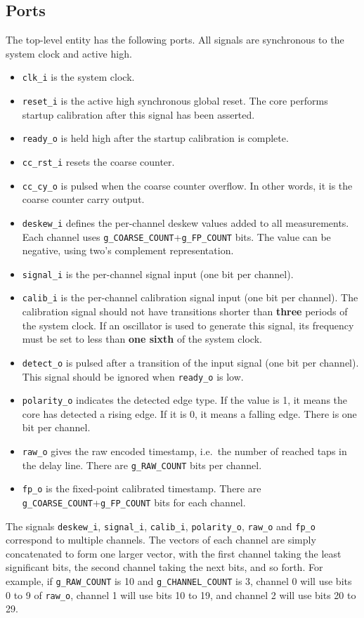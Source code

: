\documentclass[a4paper,11pt]{article}
\begin{document}
\subsection{Ports}
The top-level entity has the following ports. All signals are synchronous to the system clock and active high.
\begin{itemize}
\item \verb!clk_i! is the system clock.
\item \verb!reset_i! is the active high synchronous global reset. The core performs startup calibration after this signal has been asserted.
\item \verb!ready_o! is held high after the startup calibration is complete.
\item \verb!cc_rst_i! resets the coarse counter.
\item \verb!cc_cy_o! is pulsed when the coarse counter overflow. In other words, it is the coarse counter carry output.
\item \verb!deskew_i! defines the per-channel deskew values added to all measurements. Each channel uses \verb!g_COARSE_COUNT!+\verb!g_FP_COUNT! bits. The value can be negative, using two's complement representation.
\item \verb!signal_i! is the per-channel signal input (one bit per channel).
\item \verb!calib_i! is the per-channel calibration signal input (one bit per channel). The calibration signal should not have transitions shorter than \textbf{three} periods of the system clock. If an oscillator is used to generate this signal, its frequency must be set to less than \textbf{one sixth} of the system clock.
\item \verb!detect_o! is pulsed after a transition of the input signal (one bit per channel). This signal should be ignored when \verb!ready_o! is low.
\item \verb!polarity_o! indicates the detected edge type. If the value is 1, it means the core has detected a rising edge. If it is 0, it means a falling edge. There is one bit per channel.
\item \verb!raw_o! gives the raw encoded timestamp, i.e.\ the number of reached taps in the delay line. There are \verb!g_RAW_COUNT! bits per channel.
\item \verb!fp_o! is the fixed-point calibrated timestamp. There are \verb!g_COARSE_COUNT!+\verb!g_FP_COUNT! bits for each channel.
\end{itemize}

The signals \verb!deskew_i!, \verb!signal_i!, \verb!calib_i!, \verb!polarity_o!, \verb!raw_o! and \verb!fp_o! correspond to multiple channels. The vectors of each channel are simply concatenated to form one larger vector, with the first channel taking the least significant bits, the second channel taking the next bits, and so forth. For example, if \verb!g_RAW_COUNT! is 10 and \verb!g_CHANNEL_COUNT! is 3, channel 0 will use bits 0 to 9 of \verb!raw_o!, channel 1 will use bits 10 to 19, and channel 2 will use bits 20 to 29.
\end{document}
